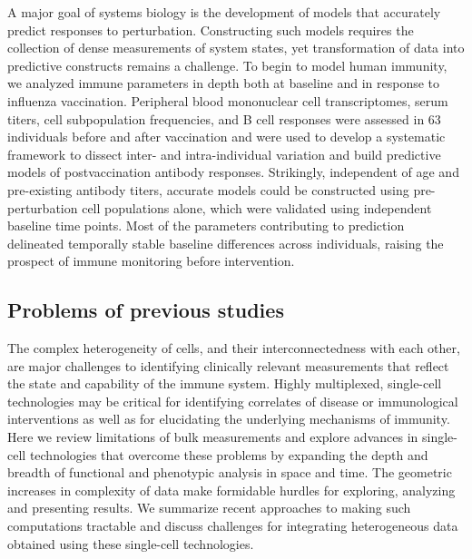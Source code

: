 \cite{tsangGlobalAnalysesHuman2014}
A major goal of systems biology is the development of models that accurately
predict responses to perturbation. Constructing such models requires the
collection of dense measurements of system states, yet transformation of data
into predictive constructs remains a challenge. To begin to model human
immunity, we analyzed immune parameters in depth both at baseline and in
response to influenza vaccination. Peripheral blood mononuclear cell
transcriptomes, serum titers, cell subpopulation frequencies, and B cell
responses were assessed in 63 individuals before and after vaccination and were
used to develop a systematic framework to dissect inter- and intra-individual
variation and build predictive models of postvaccination antibody responses.
Strikingly, independent of age and pre-existing antibody titers, accurate
models could be constructed using pre-perturbation cell populations alone,
which were validated using independent baseline time points. Most of the
parameters contributing to prediction delineated temporally stable baseline
differences across individuals, raising the prospect of immune monitoring
before intervention.

\subsection{Problems of previous studies}
\cite{chattopadhyaySinglecellTechnologiesMonitoring2014}
The complex heterogeneity of cells, and their interconnectedness with each
other, are major challenges to identifying clinically relevant measurements
that reflect the state and capability of the immune system. Highly multiplexed,
single-cell technologies may be critical for identifying correlates of disease
or immunological interventions as well as for elucidating the underlying
mechanisms of immunity. Here we review limitations of bulk measurements and
explore advances in single-cell technologies that overcome these problems by
expanding the depth and breadth of functional and phenotypic analysis in space
and time. The geometric increases in complexity of data make formidable hurdles
for exploring, analyzing and presenting results. We summarize recent approaches
to making such computations tractable and discuss challenges for integrating
heterogeneous data obtained using these single-cell technologies.

